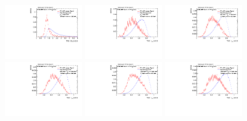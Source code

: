 \begin{figure}
\includegraphics[width=0.3\textwidth]{sascha_input/Appendix/Distributions/w/distributions/beta05/h_assisted_tj_D2_05_bin6.pdf}
\bigskip 
\includegraphics[width=0.3\textwidth]{sascha_input/Appendix/Distributions/w/distributions/beta05/h_assisted_tj_nSub21_05_bin1.pdf} \hspace{1mm}
\includegraphics[width=0.3\textwidth]{sascha_input/Appendix/Distributions/w/distributions/beta05/h_assisted_tj_nSub21_05_bin2.pdf} \hspace{1mm}
\includegraphics[width=0.3\textwidth]{sascha_input/Appendix/Distributions/w/distributions/beta05/h_assisted_tj_nSub21_05_bin3.pdf} 
\bigskip
\includegraphics[width=0.3\textwidth]{sascha_input/Appendix/Distributions/w/distributions/beta05/h_assisted_tj_nSub21_05_bin4.pdf} \hspace{6mm}
\includegraphics[width=0.3\textwidth]{sascha_input/Appendix/Distributions/w/distributions/beta05/h_assisted_tj_nSub21_05_bin5.pdf} \hspace{6mm}

\end{figure}
